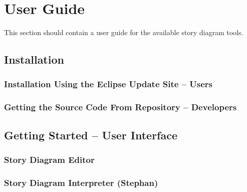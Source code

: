 \chapter{User Guide}\label{sec:UserGuide}
	
This section should contain a user guide for the available story diagram tools.


\section{Installation}


\subsection{Installation Using the Eclipse Update Site -- Users}


\subsection{Getting the Source Code From Repository -- Developers}


\section{Getting Started -- User Interface}

\subsection{Story Diagram Editor}

\subsection{Story Diagram Interpreter (Stephan)}